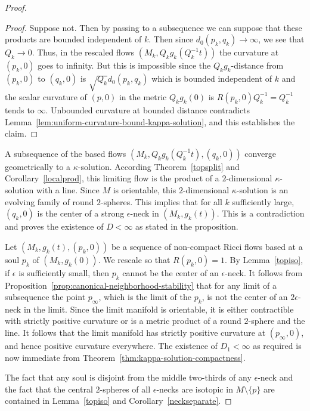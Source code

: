 \begin{proof}
\begin{proof}
Suppose not. Then by passing to a subsequence we can suppose that
these products are bounded independent of $k$. Then since
$d_0(p_k,q_k)\rightarrow\infty$, we see that $Q_k\rightarrow 0$.
Thus, in the rescaled flows $(M_k,Q_kg_k(Q_k^{-1}t))$ the curvature
at $(p_k,0)$ goes to infinity. But this is impossible since the
$Q_kg_k$-distance from $(p_k,0)$ to $(q_k,0)$ is
$\sqrt{Q_k}d_0(p_k,q_k)$ which is bounded independent of $k$ and the
scalar curvature of $(p,0)$ in the metric $Q_kg_k(0)$ is
$R(p_k,0)Q_k^{-1}=Q_k^{-1}$ tends to $\infty$. Unbounded curvature
at bounded distance contradicts Lemma~\ref{lem:uniform-curvature-bound-kappa-solution}, and this
establishes the claim.
\end{proof}

A subsequence of the based flows $(M_k,Q_kg_k(Q_k^{-1}t),(q_k,0))$
converge geometrically to a $\kappa$-solution. According
Theorem~\ref{topsplit} and Corollary~\ref{localprod}, this limiting
flow is the product of a $2$-dimensional $\kappa$-solution with a
line. Since $M$ is orientable, this $2$-dimensional
$\kappa$-solution is an evolving family of round $2$-spheres. This
implies that for all $k$ sufficiently large, $(q_k,0)$ is the center
of a strong $\epsilon$-neck in $(M_k,g_k(t))$. This is a
contradiction and proves the existence of $D<\infty$ as stated  in
the proposition.


Let $(M_k,g_k(t),(p_k,0))$ be a  sequence of non-compact Ricci flows
based at a soul  $p_k$ of $(M_k,g_k(0))$. We rescale so that
$R(p_k,0)=1$. By Lemma~\ref{topiso}, if $\epsilon$ is sufficiently
small, then $p_k$ cannot be the center of an $\epsilon$-neck. It
follows from Proposition~\ref{prop:canonical-neighborhood-stability} that for any limit of a
subsequence the point $p_\infty$, which is the limit of the $p_k$,
is not the center of an $2\epsilon$-neck in the limit. Since the
limit manifold is orientable, it is either contractible with
strictly positive curvature or is a metric product of a round
$2$-sphere and the line. It follows that the limit manifold has
strictly positive curvature at $(p_\infty,0)$, and hence positive
curvature everywhere. The existence of $D_1<\infty$ as required is
now immediate from Theorem~\ref{thm:kappa-solution-compactness}.

The fact that any soul is disjoint from the middle two-thirds of any
$\epsilon$-neck and the fact that the central $2$-spheres of all
$\epsilon$-necks are isotopic in $M\setminus\{p\}$ are contained in
Lemma~\ref{topiso} and Corollary~\ref{neckseparate}.
\end{proof}




